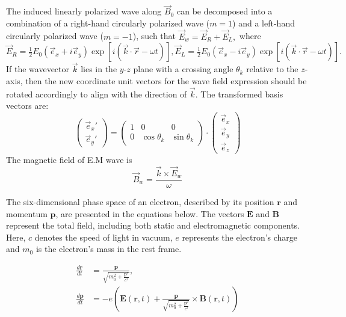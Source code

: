 \documentclass{cpbtex}
\begin{document}
\begin{CJK*}{GBK}{song}
The induced linearly polarized wave along \( \vec{B}_0 \) can be decomposed into a combination of a right-hand circularly polarized wave (\( m = 1 \)) and a left-hand circularly polarized wave (\( m = -1 \)), such that
\(
\vec{E}_w = \vec{E}_R + \vec{E}_L,
\)
where
\(
\vec{E}_R = \frac{1}{2} E_0 (\vec{e}_x + i\vec{e}_y) \exp[i(\vec{k} \cdot \vec{r} - \omega t)],
\vec{E}_L = \frac{1}{2} E_0 (\vec{e}_x - i\vec{e}_y) \exp[i(\vec{k} \cdot \vec{r} - \omega t)].
\)
If the wavevector \( \vec{k} \) lies in the \( y \)-\( z \) plane with a crossing angle \( \theta_k \) relative to the \( z \)-axis, then the new coordinate unit vectors for the wave field expression should be rotated accordingly to align with the direction of \( \vec{k} \). The transformed basis vectors are:
\begin{equation}
\begin{pmatrix}
\vec{e}_x' \\
\vec{e}_y'
\end{pmatrix}
=
\begin{pmatrix}
1 & 0 & 0 \\
0 & \cos\theta_k & \sin\theta_k
\end{pmatrix}
\cdot
\begin{pmatrix}
\vec{e}_x \\
\vec{e}_y \\
\vec{e}_z
\end{pmatrix}
\end{equation}
The magnetic field of E.M wave is
\begin{equation}
\vec{B}_w = \frac{\vec{k} \times \vec{E}_w}{\omega}
\end{equation}

The six-dimensional phase space of an electron, described by its position $\bm{r}$ and momentum $\bm{p}$, are presented in the equations below. The vectors $\bm{E}$ and $\bm{B}$ represent the total field, including both static and electromagnetic components. Here, $c$ denotes the speed of light in vacuum, $e$ represents the electron’s charge and $m_0$ is the electron’s mass in the rest frame.

\begin{equation}
\begin{aligned}
\frac{d\bm{r}}{dt} &= \frac{\bm{p}}{\sqrt{m_0^2 + \frac{\bm{p}^2}{c^2}}}, \\
\frac{d\bm{p}}{dt} &= -e \left( \bm{E}(\bm{r}, t) + \frac{\bm{p}}{\sqrt{m_0^2 + \frac{\bm{p}^2}{c^2}}} \times \bm{B}(\bm{r}, t) \right)
\end{aligned}
\end{equation}


\end{CJK*}
\end{document}

